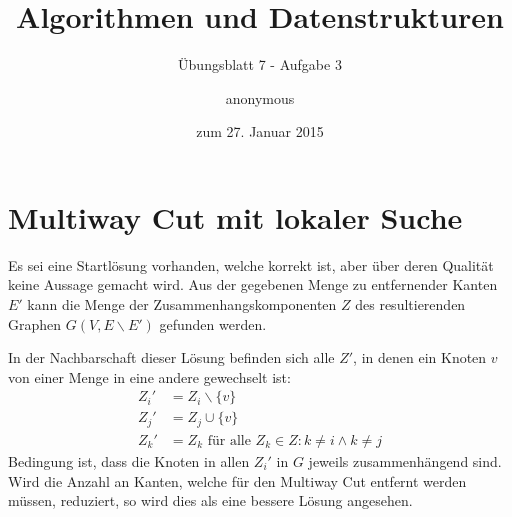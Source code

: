 \documentclass[a4paper]{scrartcl}
\title{Algorithmen und Datenstrukturen}
\subtitle{Übungsblatt 7 - Aufgabe 3}
\author{
    anonymous
}
\date{zum 27. Januar 2015}
\begin{document}
\maketitle

\section*{Multiway Cut mit lokaler Suche}
Es sei eine Startlösung vorhanden, welche korrekt ist, aber über deren Qualität
keine Aussage gemacht wird.
Aus der gegebenen Menge zu entfernender Kanten $E'$ kann die Menge der
Zusammenhangskomponenten $Z$ des resultierenden Graphen $G(V, E \backslash E')$
gefunden werden.

In der Nachbarschaft dieser Lösung befinden sich alle $Z'$, in denen ein Knoten
$v$ von einer Menge in eine andere gewechselt ist:
\begin{equation}
    \begin{split}
        Z_i' &= Z_i \backslash \{v\} \\
        Z_j' &= Z_j \cup \{v\} \\
        Z_k' &= Z_k \text{ für alle } Z_k \in Z : k \neq i \land k \neq j
    \end{split}
\end{equation}
Bedingung ist, dass die Knoten in allen $Z_i'$ in $G$ jeweils zusammenhängend
sind.
Wird die Anzahl an Kanten, welche für den Multiway Cut entfernt werden müssen,
reduziert, so wird dies als eine bessere Lösung angesehen.
\end{document}
